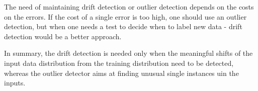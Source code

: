 The need of maintaining drift detection or outlier detection depends on the costs on the errors. If the cost of a single error is too high, one should use an outlier detection, but when one needs a test to decide when to label new data - drift detection would be a better approach.

In summary, the drift detection is needed only when the meaningful shifts of the input data distribution from the training distribution need to be detected, whereas the outlier detector aims at finding unusual single instances uin the inputs.